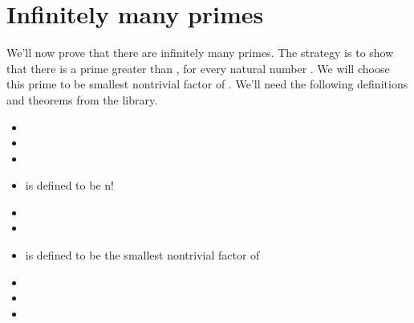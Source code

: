 \documentclass[letterpaper,10pt,english]{sphinxmanual}
\begin{document}
\section{Infinitely many primes}
\label{\detokenize{day3:id1}}
\sphinxAtStartPar
We’ll now prove that there are infinitely many primes.
The strategy is to show that there is a prime greater than , for every natural number .
We will choose this prime to be smallest non\sphinxhyphen{}trivial factor of .
We’ll need the following definitions and theorems from the library.
\begin{description}
\begin{itemize}
\item {} 
\sphinxAtStartPar
{}

\item {} 
\sphinxAtStartPar
{}

\item {} 
\sphinxAtStartPar
{}

\end{itemize}

\begin{itemize}
\item {} 
\sphinxAtStartPar
{} is defined to be n!

\item {} 
\sphinxAtStartPar
{}

\item {} 
\sphinxAtStartPar
{}

\end{itemize}

\begin{itemize}
\item {} 
\sphinxAtStartPar
{} is defined to be the smallest non\sphinxhyphen{}trivial factor of 

\item {} 
\sphinxAtStartPar
{}

\item {} 
\sphinxAtStartPar
{}

\item {} 
\sphinxAtStartPar
{}

\end{itemize}

\end{description}
\end{document}

